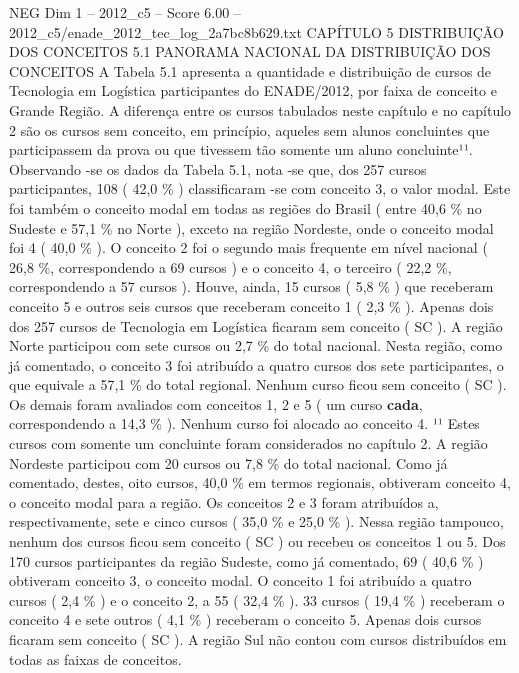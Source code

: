 \begin{textsample}{NEG Dim 1 – 2012\_c5 – Score 6.00 – 2012\_c5/enade\_2012\_tec\_log\_2a7bc8b629.txt}  \label{ex:f1_neg_329}
CAPÍTULO 5 DISTRIBUIÇÃO DOS CONCEITOS 5.1 PANORAMA NACIONAL DA DISTRIBUIÇÃO DOS CONCEITOS A Tabela 5.1 apresenta a quantidade e distribuição de cursos de Tecnologia em Logística participantes do ENADE/2012, por faixa de conceito e Grande Região.
A diferença entre os cursos tabulados neste capítulo e no capítulo 2 são os cursos sem conceito, em princípio, aqueles sem alunos concluintes que participassem da prova ou que tivessem tão somente um aluno concluinte¹¹.
Observando -se os dados da Tabela 5.1, nota -se que, dos 257 cursos participantes, 108 ( 42,0 \% ) classificaram -se com conceito 3, o valor modal.
Este foi também o conceito modal em todas as regiões do Brasil ( entre 40,6 \% no Sudeste e 57,1 \% no Norte ), exceto na região Nordeste, onde o conceito modal foi 4 ( 40,0 \% ).
O conceito 2 foi o segundo mais frequente em nível nacional ( 26,8 \%, correspondendo a 69 cursos ) e o conceito 4, o terceiro ( 22,2 \%, correspondendo a 57 cursos ).
Houve, ainda, 15 cursos ( 5,8 \% ) que receberam conceito 5 e outros seis cursos que receberam conceito 1 ( 2,3 \% ).
Apenas dois dos 257 cursos de Tecnologia em Logística ficaram sem conceito ( SC ).
A região Norte participou com sete cursos ou 2,7 \% do total nacional.
Nesta região, como já comentado, o conceito 3 foi atribuído a quatro cursos dos sete participantes, o que equivale a 57,1 \% do total regional.
Nenhum curso ficou sem conceito ( SC ).
Os demais foram avaliados com conceitos 1, 2 e 5 ( um curso \textbf{cada}, correspondendo a 14,3 \% ).
Nenhum curso foi alocado ao conceito 4. ¹¹ Estes cursos com somente um concluinte foram considerados no capítulo 2.
A região Nordeste participou com 20 cursos ou 7,8 \% do total nacional.
Como já comentado, destes, oito cursos, 40,0 \% em termos regionais, obtiveram conceito 4, o conceito modal para a região.
Os conceitos 2 e 3 foram atribuídos a, respectivamente, sete e cinco cursos ( 35,0 \% e 25,0 \% ).
Nessa região tampouco, nenhum dos cursos ficou sem conceito ( SC ) ou recebeu os conceitos 1 ou 5.
Dos 170 cursos participantes da região Sudeste, como já comentado, 69 ( 40,6 \% ) obtiveram conceito 3, o conceito modal.
O conceito 1 foi atribuído a quatro cursos ( 2,4 \% ) e o conceito 2, a 55 ( 32,4 \% ). 33 cursos ( 19,4 \% ) receberam o conceito 4 e sete outros ( 4,1 \% ) receberam o conceito 5.
Apenas dois cursos ficaram sem conceito ( SC ).
A região Sul não contou com cursos distribuídos em todas as faixas de conceitos.

\end{textsample}
